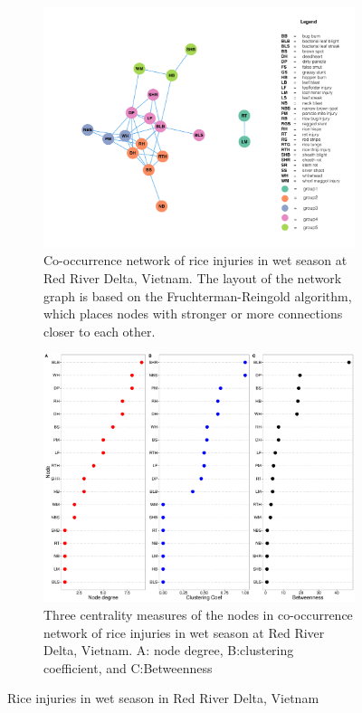 \begin{figure}
    \centering
    \begin{subfigure}[b]{1\textwidth}
        \includegraphics[width = 1\textwidth]{figures/networkRR_ws/networkRR_ws.pdf}
        \caption{Co-occurrence network of rice injuries in wet season at Red River Delta, Vietnam. The layout of the network graph is based on the Fruchterman-Reingold algorithm, which places nodes with stronger or more connections closer to each other.}
        \label{fig:networkRR_ws}
    \end{subfigure}
    \begin{subfigure}[b]{1\textwidth}
        \includegraphics[width = 1\textwidth]{figures/nodepropRR_ws/nodepropRR_ws.pdf}
        \caption{Three centrality measures of the nodes in co-occurrence network of rice injuries in wet season at Red River Delta, Vietnam. A: node degree, B:clustering coefficient, and C:Betweenness}
        \label{fig:nodeprop_ws}
    \end{subfigure}
    \caption{Rice injuries in wet season in Red River Delta, Vietnam}
    \label{fig:RR_ws}
\end{figure}


